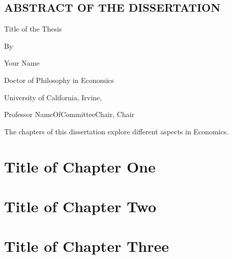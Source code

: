 \documentclass[letterpaper]{report}
\begin{document}
\newpage
\begin{center}
  \section*{ABSTRACT OF THE DISSERTATION}
  
  Title of the Thesis
  
  By
  
  Your Name
  
  Doctor of Philosophy in Economics
  
  University of California, Irvine, \the\year{}
  
  Professor NameOfCommitteeChair, Chair
\end{center}
\vspace*{1cm}

The chapters of this dissertation explore different aspects in Economics.

\newpage
\pagestyle{text}
\setcounter{page}{1}
\doublespacing

\chapter{Title of Chapter One}


\chapter{Title of Chapter Two}


\chapter{Title of Chapter Three}



\end{document}
